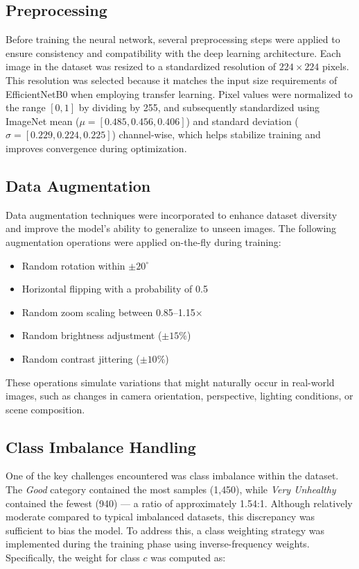 \documentclass[conference]{IEEEtran}
\begin{document}
\subsection{Preprocessing}

Before training the neural network, several preprocessing steps were applied
to ensure consistency and compatibility with the deep learning architecture.
Each image in the dataset was resized to a standardized resolution of
$224 \times 224$ pixels. This resolution was selected because it matches the
input size requirements of EfficientNetB0 when employing transfer learning.
Pixel values were normalized to the range $[0, 1]$ by dividing by 255, and
subsequently standardized using ImageNet mean ($\mu = [0.485, 0.456, 0.406]$)
and standard deviation ($\sigma = [0.229, 0.224, 0.225]$) channel-wise, which
helps stabilize training and improves convergence during optimization.

\subsection{Data Augmentation}

Data augmentation techniques were incorporated to enhance dataset diversity
and improve the model's ability to generalize to unseen images. The following
augmentation operations were applied on-the-fly during training:

\begin{itemize}
  \item Random rotation within $\pm 20^{\circ}$
  \item Horizontal flipping with a probability of 0.5
  \item Random zoom scaling between 0.85--1.15$\times$
  \item Random brightness adjustment ($\pm 15\%$)
  \item Random contrast jittering ($\pm 10\%$)
\end{itemize}

These operations simulate variations that might naturally occur in real-world
images, such as changes in camera orientation, perspective, lighting
conditions, or scene composition.

\subsection{Class Imbalance Handling}

One of the key challenges encountered was class imbalance within the dataset.
The \textit{Good} category contained the most samples (1{,}450), while
\textit{Very Unhealthy} contained the fewest (940) — a ratio of approximately
1.54:1. Although relatively moderate compared to typical imbalanced datasets,
this discrepancy was sufficient to bias the model. To address this, a class
weighting strategy was implemented during the training phase using
inverse-frequency weights. Specifically, the weight for class $c$ was
computed as:
\end{document}
